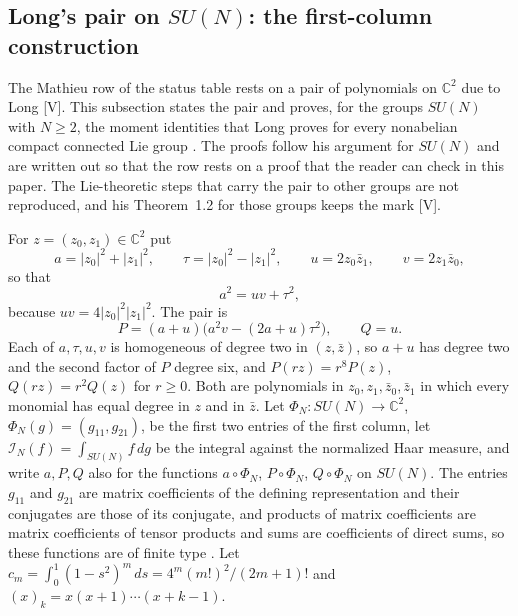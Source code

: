 \documentclass[11pt]{article}
\theoremstyle{remark}
\newcommand{\C}{\mathbb{C}}
\begin{document}
\subsection{Long's pair on \texorpdfstring{$SU(N)$}{SU(N)}: the first-column construction}\label{sec:mathieuproof}

The Mathieu row of the status table rests on a pair of polynomials on $\C^2$ due to Long \cite[equations~(3.1) and~(3.3), pp.~3--4]{LongMathieu2026} [V]. This subsection states the pair and proves, for the groups $SU(N)$ with $N\ge2$, the moment identities that Long proves for every nonabelian compact connected Lie group \cite[Theorems~1.2, 3.1 and~4.1 and Proposition~5.4, pp.~2--8]{LongMathieu2026}. The proofs follow his argument for $SU(N)$ and are written out so that the row rests on a proof that the reader can check in this paper. The Lie-theoretic steps that carry the pair to other groups are not reproduced, and his Theorem~1.2 for those groups keeps the mark [V].

For $z=(z_0,z_1)\in\C^2$ put
\begin{equation}\label{eq:quad}
a=|z_0|^2+|z_1|^2,\qquad \tau=|z_0|^2-|z_1|^2,\qquad u=2z_0\bar z_1,\qquad v=2z_1\bar z_0,
\end{equation}
so that
\begin{equation}\label{eq:hopf}
a^2=uv+\tau^2,
\end{equation}
because $uv=4|z_0|^2|z_1|^2$. The pair is
\begin{equation}\label{eq:pq}
P=(a+u)\big(a^2v-(2a+u)\tau^2\big),\qquad Q=u.
\end{equation}
Each of $a,\tau,u,v$ is homogeneous of degree two in $(z,\bar z)$, so $a+u$ has degree two and the second factor of $P$ degree six, and $P(rz)=r^8P(z)$, $Q(rz)=r^2Q(z)$ for $r\ge0$. Both are polynomials in $z_0,z_1,\bar z_0,\bar z_1$ in which every monomial has equal degree in $z$ and in $\bar z$. Let $\Phi_N:SU(N)\to\C^2$, $\Phi_N(g)=(g_{11},g_{21})$, be the first two entries of the first column, let $\mathcal I_N(f)=\int_{SU(N)}f\,dg$ be the integral against the normalized Haar measure, and write $a,P,Q$ also for the functions $a\circ\Phi_N$, $P\circ\Phi_N$, $Q\circ\Phi_N$ on $SU(N)$. The entries $g_{11}$ and $g_{21}$ are matrix coefficients of the defining representation and their conjugates are those of its conjugate, and products of matrix coefficients are matrix coefficients of tensor products and sums are coefficients of direct sums, so these functions are of finite type \cite[Lemma~2.2, p.~3]{LongMathieu2026}. Let $c_m=\int_0^1(1-s^2)^m\,ds=4^m(m!)^2/(2m+1)!$ \cite[equation~(3.5), p.~4]{LongMathieu2026} and $(x)_k=x(x+1)\cdots(x+k-1)$.
\end{document}
